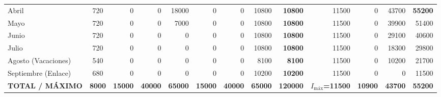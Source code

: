 \documentclass{report}
\begin{document}
\begin{table}[H]
{\begin{tabular}{l c | r r r | r r r r | r r r r}
            Abril                         & \num{720}                       & \num{0}   & \num{0}  & \num{18000}& \num{0} & \num{0}   & \num{10800}& \textbf{\num{10800}} & \num{11500} & \num{0}    & \num{43700} & \textbf{\num{55200}} \\
            Mayo                          & \num{720}                       & \num{0}   & \num{0}  & \num{7000} & \num{0} & \num{0}   & \num{10800}& \textbf{\num{10800}} & \num{11500} & \num{0}    & \num{39900} & \num{51400} \\
            Junio                         & \num{720}                       & \num{0}   & \num{0}  & \num{0}    & \num{0} & \num{0}   & \num{10800}& \textbf{\num{10800}} & \num{11500} & \num{0}    & \num{29100} & \num{40600} \\
            Julio                         & \num{720}                       & \num{0}   & \num{0}  & \num{0}    & \num{0} & \num{0}   & \num{10800}& \textbf{\num{10800}} & \num{11500} & \num{0}    & \num{18300} & \num{29800} \\
            Agosto (Vacaciones)           & \num{540}                       & \num{0}   & \num{0}  & \num{0}    & \num{0} & \num{0}   & \num{8100} & \textbf{\num{8100}}  & \num{11500} & \num{0}    & \num{10200} & \num{21700} \\
            Septiembre (Enlace)           & \num{680}                       & \num{0}   & \num{0}  & \num{0}    & \num{0} & \num{0}   & \num{10200}& \textbf{\num{10200}} & \num{11500} & \num{0}    & \num{0}     & \num{11500} \\
            \midrule
            \textbf{TOTAL / MÁXIMO}       & \textbf{\num{8000}}             & \textbf{\num{15000}} & \textbf{\num{40000}} & \textbf{\num{65000}} & \textbf{\num{15000}} & \textbf{\num{40000}} & \textbf{\num{65000}} & \textbf{\num{120000}} & \textbf{$I_{\text{máx}}$=\num{11500}} & \textbf{\num{10900}} & \textbf{\num{43700}} & \textbf{\num{55200}} \\
            \bottomrule
        \end{tabular}%
    }
    \label{tab:planificacion_mensual}
\end{table}
\end{document}
